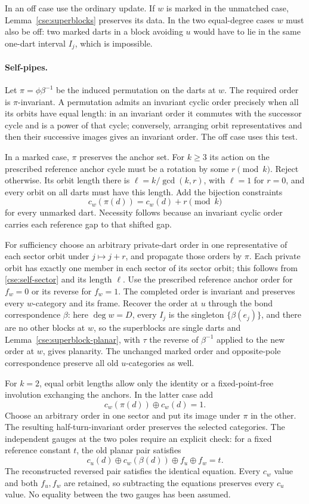 In an off case use the ordinary update. If $w$ is marked in the unmatched
case, Lemma~\ref{cse:superblocks} preserves its data. In the two equal-degree
cases $w$ must also be off: two marked darts in a block avoiding $u$
would have to lie in the same one-dart interval $I_j$, which is impossible.

\paragraph{Self-pipes.}
Let $\pi=\phi\beta^{-1}$ be the induced permutation on the darts at $w$.
The required order is $\pi$-invariant. A permutation admits an invariant
cyclic order precisely when all its orbits have equal length: in an
invariant order it commutes with the successor cycle and is a power of
that cycle; conversely, arranging orbit representatives and then their
successive images gives an invariant order. The off case uses this test.

In a marked case, $\pi$ preserves the anchor set. For $k\ge3$ its action
on the prescribed reference anchor cycle must be a rotation by some
$r\pmod{k}$. Reject otherwise. Its orbit length there is
$\ell=k/\gcd(k,r)$, with $\ell=1$ for $r=0$, and every orbit on all
darts must have this length. Add the bijection constraints
\begin{equation}
\label{cse:self-sector}
 c_w(\pi(d))=c_w(d)+r\pmod{k}
\end{equation}
for every unmarked dart. Necessity follows because an invariant cyclic
order carries each reference gap to that shifted gap.

For sufficiency choose an arbitrary private-dart order in one
representative of each sector orbit under $j\mapsto j+r$, and propagate
those orders by $\pi$. Each private orbit has exactly one member in each
sector of its sector orbit; this follows from \eqref{cse:self-sector} and
its length $\ell$. Use the prescribed reference anchor order for $f_w=0$
or its reverse for $f_w=1$. The completed order is invariant and preserves
every $w$-category and its frame. Recover the order at $u$ through the
bond correspondence $\beta$: here $\deg w=D$, every $I_j$ is the singleton
$\{\beta(e_j)\}$, and there are no other blocks at $w$, so the
superblocks are single darts and Lemma~\ref{cse:superblock-planar}, with
$\tau$ the reverse of $\beta^{-1}$ applied to the new order at $w$, gives
planarity. The unchanged marked order and opposite-pole correspondence
preserve all old $u$-categories as well.

For $k=2$, equal orbit lengths allow only the identity or a fixed-point-free
involution exchanging the anchors. In the latter case add
\[
 c_w(\pi(d))\oplus c_w(d)=1.
\]
Choose an arbitrary order in one sector and put its image under $\pi$ in
the other. The resulting half-turn-invariant order preserves the selected
categories. The independent gauges at the two poles require an explicit
check: for a fixed reference constant $t$, the old planar pair satisfies
\[
 c_u(d)\oplus c_w(\beta(d))\oplus f_u\oplus f_w=t.
\]
The reconstructed reversed pair satisfies the identical equation. Every
$c_w$ value and both $f_u,f_w$ are retained, so subtracting the equations
preserves every $c_u$ value. No equality between the two gauges has been
assumed.

